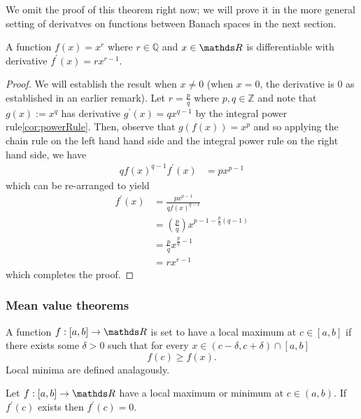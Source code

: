 We omit the proof of this theorem right now; we will prove it in the
more general setting of derivatves on functions between Banach spaces
in the next section.
\begin{prop}
\label{prop:rationalPowerRule}A function $f\left(x\right)=x^{r}$
where $r\in\mathds{Q}$ and $x\in\R$ is differentiable with derivative
$f^{\prime}\left(x\right)=rx^{r-1}.$
\end{prop}

\begin{proof}
We will establish the result when $x\neq0$ (when $x=0$, the derivative
is 0 as established in an earlier remark). Let $r=\frac{p}{q}$ where
$p,q\in\mathds{Z}$ and note that $g\left(x\right):=x^{q}$ has derivative
$g^{\prime}\left(x\right)=qx^{q-1}$ by the integral power rule\ref{cor:powerRule}.
Then, observe that $g\left(f\left(x\right)\right)=x^{p}$ and so applying
the chain rule on the left hand hand side and the integral power rule
on the right hand side, we have
\begin{align*}
qf\left(x\right)^{q-1}f^{\prime}\left(x\right) & =px^{p-1}
\end{align*}
which can be re-arranged to yield
\begin{align*}
f^{\prime}\left(x\right) & =\frac{px^{p-1}}{qf\left(x\right)^{q-1}}\\
 & =\left(\frac{p}{q}\right)x^{p-1-\frac{p}{q}\left(q-1\right)}\\
 & =\frac{p}{q}x^{\frac{p}{q}-1}\\
 & =rx^{r-1}
\end{align*}
which completes the proof.
\end{proof}

\subsubsection{Mean value theorems}
\begin{defn}
\label{def:localMax}A function $f:\left[a,b\right]\to\R$ is set
to have a local maximum at $c\in\left[a,b\right]$ if there exists
some $\delta>0$ such that for every $x\in\left(c-\delta,c+\delta\right)\cap\left[a,b\right]$
\[
f\left(c\right)\geq f\left(x\right).
\]
Local minima are defined analagously.
\end{defn}

\begin{prop}
\label{prop:firstOrderConditionR}Let $f:\left[a,b\right]\to\R$ have
a local maximum or minimum at $c\in\left(a,b\right).$ If $f^{\prime}\left(c\right)$
exists then $f^{\prime}\left(c\right)=0.$
\end{prop}

